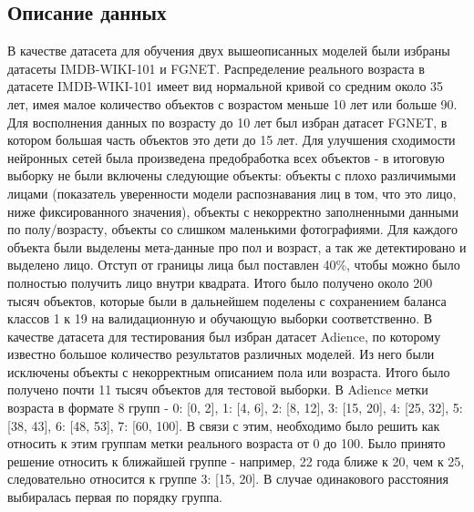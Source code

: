 \subsection{Описание данных}\label{subsec:описание-данных}
В качестве датасета для обучения двух вышеописанных моделей были избраны датасеты IMDB-WIKI-101 и FGNET\@.
Распределение реального возраста в датасете IMDB-WIKI-101 имеет вид нормальной кривой со средним около 35 лет,
имея малое количество объектов с возрастом меньше 10 лет или больше 90.
Для восполнения данных по возрасту до 10 лет был избран датасет FGNET, в котором большая часть объектов это дети до 15 лет.
Для улучшения сходимости нейронных сетей была произведена предобработка всех объектов -
в итоговую выборку не были включены следующие объекты:
объекты с плохо различимыми лицами (показатель уверенности модели распознавания лиц в том, что это лицо, ниже фиксированного значения),
объекты с некорректно заполненными данными по полу/возрасту,
объекты со слишком маленькими фотографиями.
Для каждого объекта были выделены мета-данные про пол и возраст, а так же детектировано и выделено лицо.
Отступ от границы лица был поставлен 40\%, чтобы можно было полностью получить лицо внутри квадрата.
Итого было получено около 200 тысяч объектов, которые были в дальнейшем поделены
с сохранением баланса классов 1 к 19 на валидационную и обучающую выборки соответственно.
В качестве датасета для тестирования был избран датасет Adience, по которому известно большое количество результатов различных моделей.
Из него были исключены объекты с некорректным описанием пола или возраста.
Итого было получено почти 11 тысяч объектов для тестовой выборки.
В Adience метки возраста в формате 8 групп - 0: [0, 2], 1: [4, 6], 2: [8, 12], 3: [15, 20], 4: [25, 32], 5: [38, 43], 6: [48, 53], 7: [60, 100].
В связи с этим, необходимо было решить как относить к этим группам метки реального возраста от 0 до 100.
Было принято решение относить к ближайшей группе - например, 22 года ближе к 20, чем к 25, следовательно
относится к группе 3: [15, 20].
В случае одинакового расстояния выбиралась первая по порядку группа.


